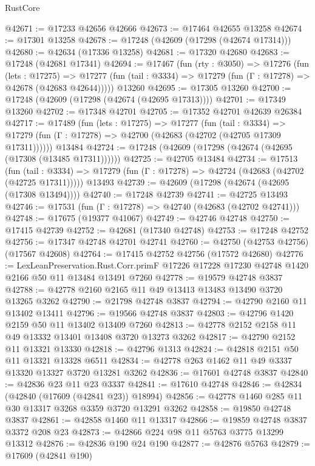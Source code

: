 \begin{lexlean}{RustCore}
\begin{coremodule}
@42671 := @17233 @42656 @42666
@42673 := @17464 @42655 @13258
@42674 := @17301 @13258
@42678 := @17248 (@42609 (@17298 (@42674 @17314)))
@42680 := @42634 (@17336 @13258)
@42681 := @17320 @42680
@42683 := @17248 (@42681 @17341)
@42694 := @17467
    (fun (rty : @3050) =>
    @17276
      (fun (lets : @17275) =>
      @17277 (fun (tail : @3334) => @17279 (fun (Γ : @17278) => @42678 (@42683 @42644)))))
    @13260
@42695 := @17305 @13260
@42700 := @17248 (@42609 (@17298 (@42674 (@42695 @17313))))
@42701 := @17349 @13260
@42702 := @17348 @42701
@42705 := @17352 @42701 @42639 @26384
@42717 := @17489
    (fun (lets : @17275) =>
    @17277
      (fun (tail : @3334) =>
      @17279 (fun (Γ : @17278) => @42700 (@42683 (@42702 (@42705 @17309 @17311))))))
    @13484
@42724 := @17248 (@42609 (@17298 (@42674 (@42695 (@17308 (@13485 @17311))))))
@42725 := @42705 @13484
@42734 := @17513
    (fun (tail : @3334) => @17279 (fun (Γ : @17278) => @42724 (@42683 (@42702 (@42725 @17311)))))
    @13493
@42739 := @42609 (@17298 (@42674 (@42695 (@17308 @13494))))
@42740 := @17248 @42739
@42741 := @42725 @13493
@42746 := @17531 (fun (Γ : @17278) => @42740 (@42683 (@42702 @42741)))
@42748 := @17675 (@19377 @41067)
@42749 := @42746 @42748
@42750 := @17415 @42739
@42752 := @42681 (@17340 @42748)
@42753 := @17248 @42752
@42756 := @17347 @42748 @42701 @42741
@42760 := @42750 (@42753 @42756) (@17567 @42608)
@42764 := @17415 @42752 @42756 (@17572 @42680)
@42776 := LexLeanPreservation.Rust.Corr.primF
    @17226
    @17228
    @17230
    @42748
    @1420
    @2166
    @50
    @11
    @13484
    @13491
    @7260
@42778 := @19579 @42748 @3837
@42788 := @42778 @2160 @2165 @11 @49 @13413 @13483 @13490 @3720 @13265 @3262
@42790 := @21798 @42748 @3837
@42794 := @42790 @2160 @11 @13402 @13411
@42796 := @19566 @42748 @3837
@42803 := @42796 @1420 @2159 @50 @11 @13402 @13409 @7260
@42813 := @42778 @2152 @2158 @11 @49 @13332 @13401 @13408 @3720 @13273 @3262
@42817 := @42790 @2152 @11 @13321 @13330
@42818 := @42796 @1313
@42824 := @42818 @2151 @50 @11 @13321 @13328 @6511
@42834 := @42778 @263 @1462 @11 @49 @3337 @13320 @13327 @3720 @13281 @3262
@42836 := @17601 @42748 @3837
@42840 := @42836 @23 @11 @23 @3337
@42841 := @17610 @42748
@42846 := @42834 (@42840 (@17609 (@42841 @23)) @18994)
@42856 := @42778 @1460 @285 @11 @30 @13317 @3268 @3359 @3720 @13291 @3262
@42858 := @19850 @42748 @3837
@42861 := @42858 @1460 @11 @13317
@42866 := @19859 @42748 @3837 @3372 @208 @23
@42873 := @42866 @224 @98 @11 @5763 @3775 @13299 @13312
@42876 := @42836 @190 @24 @190
@42877 := @42876 @5763
@42879 := @17609 (@42841 @190)

\end{coremodule}
\end{lexlean}
